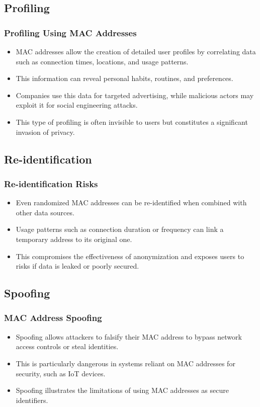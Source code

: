 \documentclass[
english,
svgnames,
notes=hide,
12pt]{beamer}
\begin{document}
\begin{frame}
  \section{Profiling}
  \frametitle{Profiling Using MAC Addresses}
  \begin{itemize}
    \item MAC addresses allow the creation of detailed user profiles by correlating data such as connection times, locations, and usage patterns. \pause
    \item This information can reveal personal habits, routines, and preferences. \pause
    \item Companies use this data for targeted advertising, while malicious actors may exploit it for social engineering attacks. \pause
    \item This type of profiling is often invisible to users but constitutes a significant invasion of privacy. 
  \end{itemize}
\end{frame}

\begin{frame}
  \section{Re-identification}
  \frametitle{Re-identification Risks}
  \begin{itemize}
    \item Even randomized MAC addresses can be re-identified when combined with other data sources. \pause
    \item Usage patterns such as connection duration or frequency can link a temporary address to its original one. \pause
    \item This compromises the effectiveness of anonymization and exposes users to risks if data is leaked or poorly secured. 
  \end{itemize}
\end{frame}

\begin{frame}
  \section{Spoofing}
  \frametitle{MAC Address Spoofing}
  \begin{itemize}
    \item Spoofing allows attackers to falsify their MAC address to bypass network access controls or steal identities. \pause
    \item This is particularly dangerous in systems reliant on MAC addresses for security, such as IoT devices. \pause
    \item Spoofing illustrates the limitations of using MAC addresses as secure identifiers. 
  \end{itemize}
\end{frame}
\end{document}
